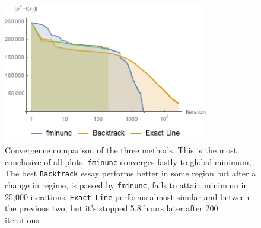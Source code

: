 \documentclass[a4paper,8pt,twocolumn]{article}
\begin{document}
\begin{figure}[!ht]
\begin{center}
\includegraphics[width=9cm]{f6.png}
\caption{\footnotesize{Convergence comparison of the three methods. This is the most conclusive of all plots. \texttt{fminunc} converges fastly to global minimum, The best \texttt{Backtrack}} essay performs better in some region but after a change in regime, is passed by \texttt{fminunc}, fails to attain minimum in 25,000 iterations. \texttt{Exact Line} performs almost similar and between the previous two, but it's stopped 5.8 hours later after 200 iterations.\label{f6}}
\end{center}
\end{figure}
\end{document}
